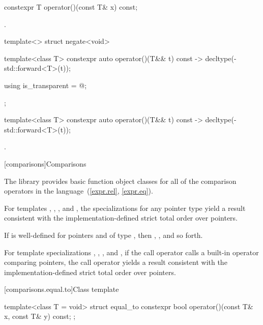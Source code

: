 %
\begin{itemdecl}
constexpr T operator()(const T& x) const;
\end{itemdecl}

\begin{itemdescr}
\pnum
\returns
{}.
\end{itemdescr}

%
\begin{itemdecl}
template<> struct negate<void> {
  template<class T> constexpr auto operator()(T&& t) const
    -> decltype(-std::forward<T>(t));

  using is_transparent = @\unspec@;
};
\end{itemdecl}

%
\begin{itemdecl}
template<class T> constexpr auto operator()(T&& t) const
    -> decltype(-std::forward<T>(t));
\end{itemdecl}

\begin{itemdescr}
\pnum
\returns
{}.
\end{itemdescr}


[comparisons]{Comparisons}

\pnum
The library provides basic function object classes for all of the comparison
operators in the language~(\ref{expr.rel}, \ref{expr.eq}).

\pnum
For templates , , , and
, the specializations for any pointer type
yield a result consistent with the
implementation-defined strict total order over pointers.
\begin{note}
If  is well-defined
for pointers  and  of type ,
then ,
, and so forth.
\end{note}
For template specializations , ,
, and ,
if the call operator calls a built-in operator comparing pointers,
the call operator yields a result consistent
with the implementation-defined strict total order over pointers.

[comparisons.equal.to]{Class template }

%
\begin{itemdecl}
template<class T = void> struct equal_to {
  constexpr bool operator()(const T& x, const T& y) const;
};
\end{itemdecl}

